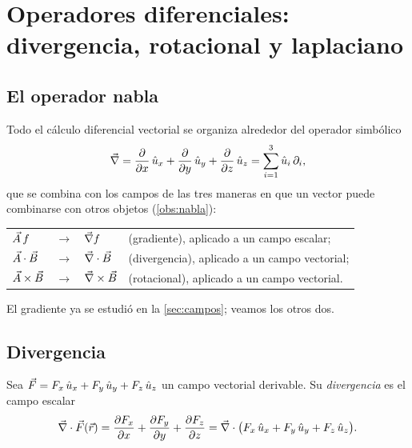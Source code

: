 \section{Operadores diferenciales: divergencia, rotacional y laplaciano}\label{sec:operadores}

\subsection{El operador nabla}\label{sec:nabla}
Todo el cálculo diferencial vectorial se organiza alrededor del operador
simbólico
\begin{equation}\label{eq:nabla}
  \vec{\nabla}=\frac{\partial }{\partial x}\,\hat{u}_{x}+\frac{\partial }{\partial y}\,\hat{u}_{y}+\frac{\partial }{\partial z}\,\hat{u}_{z}=\sum_{i=1}^{3}\hat{u}_{i}\,\partial_i ,
\end{equation}
que se combina con los campos de las tres maneras en que un vector puede
combinarse con otros objetos (\cref{obs:nabla}):
\begin{center}
\renewcommand{\arraystretch}{1.25}
\begin{tabular}{@{}lcll@{}}
$\vec{A}\,f$ & $\longrightarrow$ & $\vec{\nabla} f$ & (gradiente), aplicado a un campo escalar;\\
$\vec{A}\cdot\vec{B}$ & $\longrightarrow$ & $\vec{\nabla}\cdot\vec{B}$ & (divergencia), aplicado a un campo vectorial;\\
$\vec{A}\times\vec{B}$ & $\longrightarrow$ & $\vec{\nabla}\times\vec{B}$ & (rotacional), aplicado a un campo vectorial.
\end{tabular}
\end{center}
El gradiente ya se estudió en la \cref{sec:campos}; veamos los otros dos.

\subsection{Divergencia}\label{sec:divergencia}
\begin{definicion}[Divergencia]\label{def:divergencia}
Sea $\vec{F}=F_x\,\hat{u}_{x}+F_y\,\hat{u}_{y}+F_z\,\hat{u}_{z}$ un campo vectorial derivable. Su
\emph{divergencia} es el campo escalar
\begin{equation}\label{eq:div}
  \vec{\nabla}\cdot\vec{F}(\vec{r})=\frac{\partial F_x}{\partial x}+\frac{\partial F_y}{\partial y}+\frac{\partial F_z}{\partial z}
  =\vec{\nabla}\cdot\bigl(F_x\,\hat{u}_{x}+F_y\,\hat{u}_{y}+F_z\,\hat{u}_{z}\bigr).
\end{equation}
\end{definicion}

